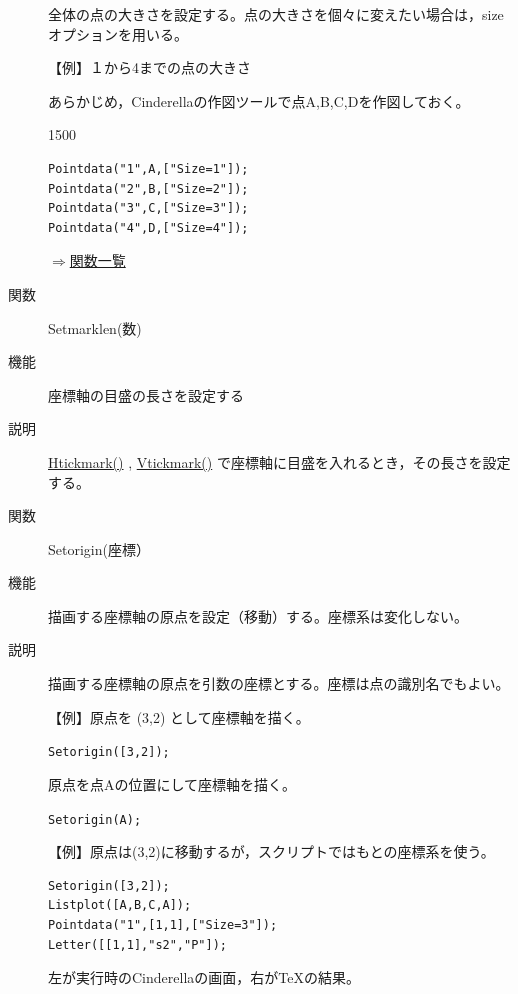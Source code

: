 \documentclass[papersize,a4paper,10pt,uplatex]{jsarticle}
\begin{document}
\begin{description}
全体の点の大きさを設定する。点の大きさを個々に変えたい場合は，sizeオプションを用いる。

\vspace{\baselineskip}
【例】１から4までの点の大きさ

あらかじめ，Cinderellaの作図ツールで点A,B,C,Dを作図しておく。

\begin{layer}{150}{0}
\end{layer}

\begin{verbatim}
Pointdata("1",A,["Size=1"]);
Pointdata("2",B,["Size=2"]);
Pointdata("3",C,["Size=3"]);
Pointdata("4",D,["Size=4"]);
\end{verbatim}


\begin{flushright}\hyperlink{functionlist}{$\Rightarrow$関数一覧}\end{flushright}


\vspace{\baselineskip}
\hypertarget{setmarklen}{}
\item[関数]Setmarklen(数)
\item[機能]座標軸の目盛の長さを設定する
\item[説明] \hyperlink{htickmark}{Htickmark()} , \hyperlink{vtickmark}{Vtickmark()} で座標軸に目盛を入れるとき，その長さを設定する。 

\vspace{\baselineskip}
\hypertarget{setorigin}{}
\item[関数]Setorigin(座標）
\item[機能]描画する座標軸の原点を設定（移動）する。座標系は変化しない。
\item[説明]描画する座標軸の原点を引数の座標とする。座標は点の識別名でもよい。

\vspace{\baselineskip}
【例】原点を (3,2) として座標軸を描く。

\hspace{10mm}\verb|Setorigin([3,2]);|

原点を点Aの位置にして座標軸を描く。

\hspace{10mm}\verb|Setorigin(A);|

\vspace{\baselineskip}
【例】原点は(3,2)に移動するが，スクリプトではもとの座標系を使う。
\begin{verbatim}
Setorigin([3,2]);
Listplot([A,B,C,A]);
Pointdata("1",[1,1],["Size=3"]);
Letter([[1,1],"s2","P"]);
\end{verbatim}
左が実行時のCinderellaの画面，右が\TeX の結果。\\


\end{description}
\end{document}
